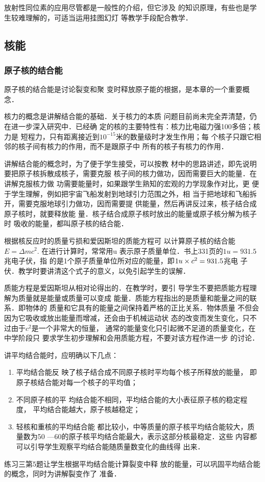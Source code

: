 放射性同位素的应用尽管都是一般性的介绍，但它涉及
的知识原理，有些也是学生较难理解的，可适当运用挂图幻灯
等教学手段配合教学．

\subsection{核能}
\subsubsection{原子核的结合能}

原子核的结合能是讨论裂变和聚
变时释放原子能的根据，是本章的一个重要概念．

核力的概念是讲解结合能的基础．关于核力的本质
问题目前尚未完全弄清楚，仍在进一步深入研究中．已经确
定的核的主要特性有：核力比电磁力强100多倍；核力是
短程力，只有距离接近到$10^{-15}$米的数量级时才发生作用；每
个核子只跟它相邻的核子间有核力的作用，而不是跟原子中
所有的核子有核力的作用．

讲解结合能的概念时，为了便于学生接受，可以按教
材中的思路讲述，即先说明要把原子核拆散成核子，需要克服
核子间的核力做功，因而需要巨大的能量．在讲解克服核力做
功需要能量时，如果跟学生熟知的宏观的力学现象作对比，更
便于学生理解，例如把宇宙飞船发射到地球引力范围之外，相
当于把地球和飞船拆开，需要克服地球引力做功，因而需要提
供能量，然后再讲反过来，核子结合成原子核时，就要释放能
量．核子结合成原子核时放出的能量或原子核分解为核子时
吸收的能量，都叫原子核的结合能．

根据核反应时的质量亏损和爱因斯坦的质能方程可
以计算原子核的结合能$E=\Delta mc^2$. 在进行计算时，常常用u
表示原子质量单位．书上331页的$1u=931.5$兆电子伏，指
的是1个原子质量单位所对应的能量，即$1u\times c^2=931.5$兆电
子伏．教学时要讲清这个式子的意义，以免引起学生的误解．

质能方程是爱因斯坦从相对论得出的．在教学时，要引
导学生不要把质能方程理解为质量就是能量或质量可以变成
能量．质能方程指出的是质量和能量之间的联系．即物体的
质量和它具有的能量之间保持着严格的正比关系．物体质量
不但会因为它吸收或放出能量而增减，还会由于机械运动状
态的改变而发生变化，只不过由于$c^2$是一个非常大的恒量，
通常的能量变化只引起微不足道的质量变化，在中学阶段只
要求学生初步理解和会用质能方程，不要对该方程作进一步
的讨论．

讲平均结合能时，应明确以下几点：
\begin{enumerate}
\item 平均结合能反
映了核子结合成不同原子核时平均每个核子所释放的能量，
即原子核结合能对每一个核子的平均值；    \item 不同原子核的平
均结合能不相同，平均结合能的大小表征原子核的稳定程度，
平均结合能越大，原子核越稳定；    \item 轻核和重核的平均结合能
都比较小，中等质量的原子核平均结合能较大，质量数为50
—60的原子核平均结合能最大，表示这部分核最稳定．这些
内容都可以引导学生观察平均结合能随质量数变化的曲线得
出来．
\end{enumerate}
练习三第5题让学生根据平均结合能计算裂变中释
放的能量，可以巩固平均结合能的概念，同时为讲解裂变作了
准备．

